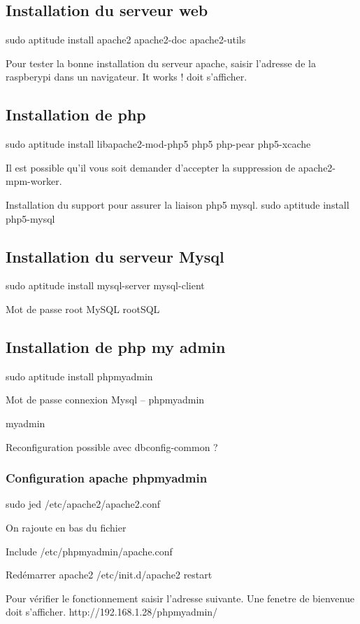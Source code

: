\documentclass[10pt]{article}
\begin{document}
\subsection{Installation du serveur web}
sudo aptitude install apache2 apache2-doc apache2-utils

Pour tester la bonne installation du serveur apache, saisir l'adresse de la raspberypi dans un navigateur. 
It works ! doit s'afficher. 

\subsection{Installation de php}

sudo aptitude install libapache2-mod-php5 php5 php-pear php5-xcache


Il est possible qu'il vous soit demander d'accepter la suppression de apache2-mpm-worker. 


Installation du support pour assurer la liaison php5 mysql. 
sudo aptitude install php5-mysql

\subsection{Installation du serveur Mysql}
sudo aptitude install mysql-server mysql-client

Mot de passe root MySQL
rootSQL

\subsection{Installation de php my admin}
sudo aptitude install phpmyadmin

Mot de passe connexion Mysql -- phpmyadmin

myadmin	


Reconfiguration possible avec dbconfig-common ?


\subsubsection{Configuration apache phpmyadmin}
sudo jed /etc/apache2/apache2.conf

On rajoute en bas du fichier

Include /etc/phpmyadmin/apache.conf

Redémarrer apache2
/etc/init.d/apache2 restart


Pour vérifier le fonctionnement saisir l'adresse suivante. 
Une fenetre de bienvenue doit s'afficher.  
http://192.168.1.28/phpmyadmin/  
\end{document}
